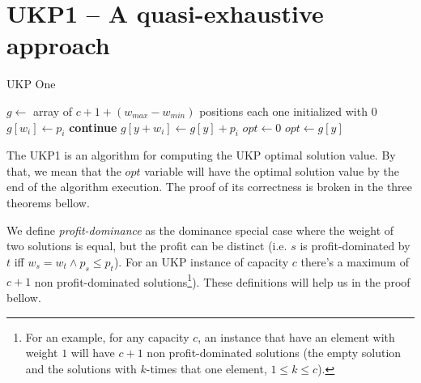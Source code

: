 \documentclass[12pt]{article}
\begin{document}

\section{UKP1 -- A quasi-exhaustive approach}

\begin{algorithm}
\caption{UKP One}\label{alg:ukp1}
\begin{algorithmic}[1]
  \State \(g \gets\) array of \(c + 1 + (w_{max} - w_{min})\) positions each one initialized with \(0\)\label{ukp1:create_g}
  \State %
  \label{begin_trivial_bounds}
      \State \(g[w_i] \gets p_i\)
    \EndIf
  \EndFor\label{end_trivial_bounds}
  \State %
  \label{ukp1:main_ext_loop_begin}
    \label{ukp1:if_equal_to_zero}
    	\State \textbf{continue}
    \EndIf\label{ukp1:if_equal_to_zero}
    \State %
    \label{ukp1:main_inner_loop_begin}
      \label{ukp1:if_better_solution_begin}
        \State \(g[y + w_i] \gets g[y] + p_i\)
      \EndIf\label{ukp1:if_better_solution_end}
    \EndFor\label{ukp1:main_inner_loop_end}
  \EndFor\label{ukp1:main_ext_loop_end}
  \State %
  \State \(opt \gets 0\)
  \label{ukp1:get_opt_loop_begin}
    \label{ukp1:opt_loop_if}
      \State \(opt \gets g[y]\)
    \EndIf
  \EndFor\label{ukp1:get_opt_loop_end}
\EndProcedure
\end{algorithmic}
\end{algorithm}

The UKP1 is an algorithm for computing the UKP optimal solution value. By that, we mean that the \(opt\) variable will have the optimal solution value by the end of the algorithm execution. The proof of its correctness is broken in the three theorems bellow.

We define \textit{profit-dominance} as the dominance special case where the weight of two solutions is equal, but the profit can be distinct (i.e. \(s\) is profit-dominated by \(t\) iff \(w_s = w_t \land p_s \leq p_t\)). For an UKP instance of capacity \(c\) there's a maximum of \(c+1\) non profit-dominated solutions\footnote{For an example, for any capacity \(c\), an instance that have an element with weight \(1\) will have \(c+1\) non profit-dominated solutions (the empty solution and the solutions with \(k\)-times that one element, \(1 \leq k \leq c\)).}). These definitions will help us in the proof bellow.
\end{document}
